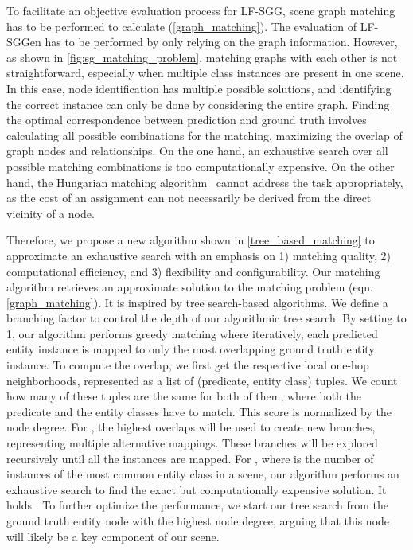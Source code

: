 \documentclass[10pt,twocolumn,letterpaper]{article}
\begin{document}
To facilitate an objective evaluation process for LF-SGG, scene graph matching has to be performed to calculate  (\cref{graph_matching}). The evaluation of LF-SGGen has to be performed by only relying on the graph information. However, as shown in \cref{fig:sg_matching_problem}, matching graphs with each other is not straightforward, especially when multiple class instances are present in one scene. In this case, node identification has multiple possible solutions, and identifying the correct instance can only be done by considering the entire graph. Finding the optimal correspondence between prediction and ground truth involves calculating all possible combinations for the matching, maximizing the overlap of graph nodes and relationships. On the one hand, an exhaustive search over all possible matching combinations is too computationally expensive. On the other hand, the Hungarian matching algorithm~\cite{kuhn_hungarian_1955} cannot address the task appropriately, as the cost of an assignment can not necessarily be derived from the direct vicinity of a node.

Therefore, we propose a new algorithm shown in \cref{tree_based_matching} to approximate an exhaustive search with an emphasis on 1) matching quality, 2) computational efficiency, and 3) flexibility and configurability. Our matching algorithm  retrieves an approximate solution  to the matching problem  (eqn.\ref{graph_matching}). It is inspired by tree search-based algorithms. We define a branching factor  to control the depth of our algorithmic tree search. By setting  to 1, our algorithm performs greedy matching where iteratively, each predicted entity instance is mapped to only the most overlapping ground truth entity instance. To compute the overlap, we first get the respective local one-hop neighborhoods, represented as a list of (predicate, entity class) tuples. We count how many of these tuples are the same for both of them, where both the predicate and the entity classes have to match. This score is normalized by the node degree. For , the  highest overlaps will be used to create new branches, representing multiple alternative mappings. These branches will be explored recursively until all the instances are mapped. For , where  is the number of instances of the most common entity class in a scene, our algorithm performs an exhaustive search to find the exact but computationally expensive solution. It holds . To further optimize the performance, we start our tree search from the ground truth entity node with the highest node degree, arguing that this node will likely be a key component of our scene.
\end{document}
